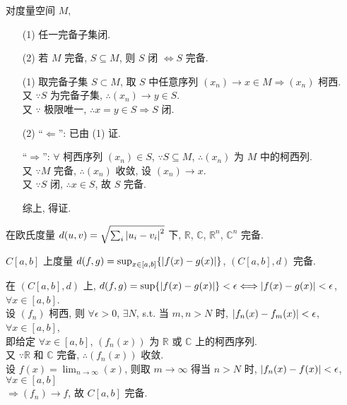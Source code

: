 \documentclass{note}
\begin{document}
\begin{thm}[(课本定理 12.6)]\label{thm-12.6}
    对度量空间 $M$,
    \begin{itemize}
        \item[(1)] 任一完备子集闭.
        \item[(2)] 若 $M$ 完备, $S\subseteq M$, 则 $S$ 闭 $\Longleftrightarrow S$ 完备.
    \end{itemize}
\end{thm}
\begin{pf}
    \begin{itemize}
        \item[(1)] 取完备子集 $S\subset M$, 取 $S$ 中任意序列 $(x_n)\rightarrow x\in M\Longrightarrow(x_n)$ 柯西.\\
        又 $\because S$ 为完备子集, $\therefore(x_n)\rightarrow y\in S$.\\
        又 $\because$ 极限唯一, $\therefore x=y\in S\Longrightarrow S$ 闭.
        \item[(2)] ``$\Longleftarrow$'': 已由 (1) 证.

        ``$\Longrightarrow$'': $\forall$ 柯西序列 $(x_n)\in S$, $\because S\subseteq M$, $\therefore(x_n)$ 为 $M$ 中的柯西列.\\
        又 $\because M$ 完备, $\therefore(x_n)$ 收敛, 设 $(x_n)\rightarrow x$.\\
        又 $\because S$ 闭, $\therefore x\in S$, 故 $S$ 完备.

        综上, 得证.
    \end{itemize}
\end{pf}

\begin{eg}
    在欧氏度量 $d(u,v)=\sqrt{\sum_i\left\lvert u_i-v_i\right\rvert^2}$ 下, $\mathbb{R}$, $\mathbb{C}$, $\mathbb{R}^n$, $\mathbb{C}^n$ 完备.
\end{eg}

\begin{eg}[(课本例 12.11)]
    $C[a,b]$ 上度量 $d(f,g)=\sup_{x\in[a,b]}\{\left\lvert f(x)-g(x)\right\rvert\}$, $(C[a,b],d)$ 完备.
    \begin{pf}
        在 $(C[a,b],d)$ 上, $d(f,g)=\sup\{\left\lvert f(x)-g(x)\right\rvert\}<\epsilon\Longleftrightarrow\left\lvert f(x)-g(x)\right\rvert<\epsilon$, $\forall x\in[a,b]$.\\
        设 $(f_n)$ 柯西, 则 $\forall\epsilon>0$, $\exists N$, s.t. 当 $m,n>N$ 时, $\left\lvert f_n(x)-f_m(x)\right\rvert<\epsilon$, $\forall x\in[a,b]$,\\
        即给定 $\forall x\in[a,b]$, $(f_n(x))$ 为 $\mathbb{R}$ 或 $\mathbb{C}$ 上的柯西序列.\\
        又 $\because\mathbb{R}$ 和 $\mathbb{C}$ 完备, $\therefore(f_n(x))$ 收敛.\\
        设 $f(x)=\lim_{n\rightarrow\infty}(x)$, 则取 $m\rightarrow\infty$ 得当 $n>N$ 时, $\left\lvert f_n(x)-f(x)\right\rvert<\epsilon$, $\forall x\in[a,b]$\\
        $\Longrightarrow(f_n)\rightarrow f$, 故 $C[a,b]$ 完备.
    \end{pf}
\end{eg}
\end{document}

